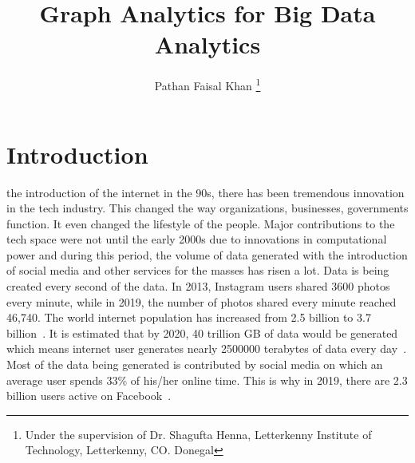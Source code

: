 \documentclass[journal,twoside,web]{ieeecolor}
\begin{document}
\title{Graph Analytics for Big Data Analytics}
\author{Pathan Faisal Khan
\thanks{Under the supervision of Dr. Shagufta Henna, Letterkenny Institute of Technology, Letterkenny, CO. Donegal}
}


\maketitle

\section{Introduction}
\label{sec:introduction}
 the introduction of the internet in the 90s, there has been tremendous innovation in the tech industry. This changed the way organizations, businesses, governments function. It even changed the lifestyle of the people. Major contributions to the tech space were not until the early 2000s due to innovations in computational power and during this period, the volume of data generated with the introduction of social media and other services for the masses has risen a lot. Data is being created every second of the data. In 2013, Instagram users shared 3600 photos every minute, while in 2019, the number of photos shared every minute reached 46,740. The world internet population has increased from 2.5 billion to 3.7 billion~\cite{1}. It is estimated that by 2020, 40 trillion GB of data would be generated~\cite{2} which means internet user generates nearly 2500000 terabytes of data every day~\cite{1}. Most of the data being generated is contributed by social media on which an average user spends 33\% of his/her online time. This is why in 2019, there are 2.3 billion users active on Facebook~\cite{3}.
\end{document}
